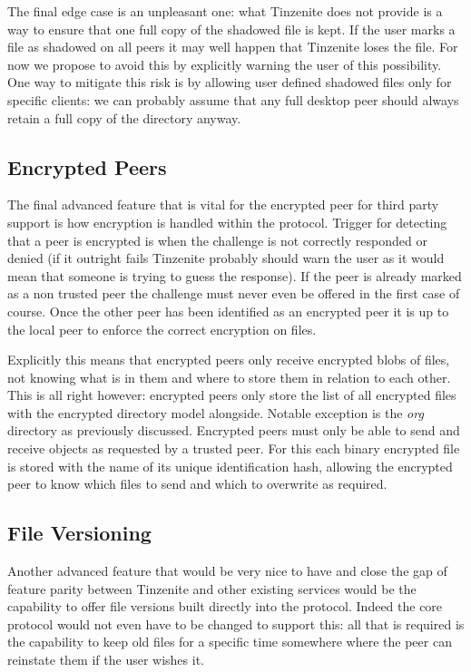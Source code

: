 The final edge case is an unpleasant one: what Tinzenite does not provide is a way to ensure that one full copy of the shadowed file is kept.
If the user marks a file as shadowed on all peers it may well happen that Tinzenite loses the file.
For now we propose to avoid this by explicitly warning the user of this possibility.
One way to mitigate this risk is by allowing user defined shadowed files only for specific clients: we can probably assume that any full desktop peer should always retain a full copy of the directory anyway.


\subsection{Encrypted Peers}
\label{sub:Encrypted Peers}

The final advanced feature that is vital for the encrypted peer for third party support is how encryption is handled within the protocol.
Trigger for detecting that a peer is encrypted is when the challenge is not correctly responded or denied (if it outright fails Tinzenite probably should warn the user as it would mean that someone is trying to guess the response).
If the peer is already marked as a non trusted peer the challenge must never even be offered in the first case of course.
Once the other peer has been identified as an encrypted peer it is up to the local peer to enforce the correct encryption on files.

Explicitly this means that encrypted peers only receive encrypted blobs of files, not knowing what is in them and where to store them in relation to each other.
This is all right however: encrypted peers only store the list of all encrypted files with the encrypted directory model alongside.
Notable exception is the \textit{org} directory as previously discussed.
Encrypted peers must only be able to send and receive objects as requested by a trusted peer.
For this each binary encrypted file is stored with the name of its unique identification hash, allowing the encrypted peer to know which files to send and which to overwrite as required.

\subsection{File Versioning}
\label{sub:File Versioning}

Another advanced feature that would be very nice to have and close the gap of feature parity between Tinzenite and other existing services would be the capability to offer file versions built directly into the protocol.
Indeed the core protocol would not even have to be changed to support this: all that is required is the capability to keep old files for a specific time somewhere where the peer can reinstate them if the user wishes it.


